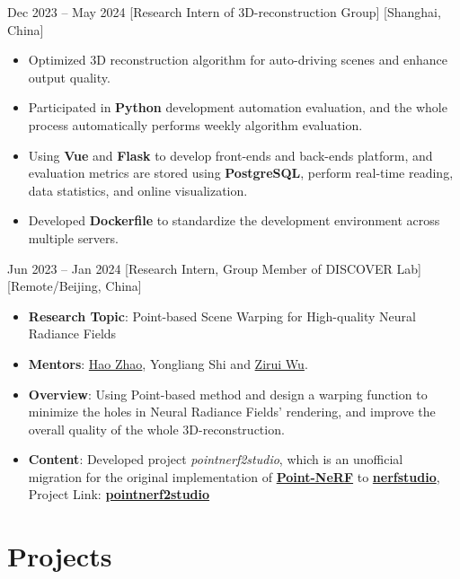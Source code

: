 \documentclass{chicv}
\begin{document}
{Dec 2023 -- May 2024}
  [Research Intern of 3D-reconstruction Group]
  [Shanghai, China]
  \begin{itemize}
    \item Optimized 3D reconstruction algorithm for auto-driving scenes and enhance output quality.
    \item Participated in \textbf{Python} development automation evaluation, and the whole process automatically performs weekly algorithm evaluation.
    \item Using \textbf{Vue} and \textbf{Flask} to develop front-ends and back-ends platform, and evaluation metrics are stored using \textbf{PostgreSQL}, perform real-time reading, data statistics, and online visualization.
    \item Developed \textbf{Dockerfile} to standardize the development environment across multiple servers.
  \end{itemize}

  {Jun 2023 -- Jan 2024}
  [Research Intern, Group Member of DISCOVER Lab]
  [Remote/Beijing, China]
  \begin{itemize}
    \item \textbf{Research Topic}: Point-based Scene Warping for High-quality Neural Radiance Fields
    \item \textbf{Mentors}: \href{https://sites.google.com/view/fromandto}{Hao Zhao}, Yongliang Shi and \href{https://wuzirui.github.io/}{Zirui Wu}.
    \item \textbf{Overview}: Using Point-based method and design a warping function to minimize the holes in Neural Radiance Fields' rendering, and improve the overall quality of the whole 3D-reconstruction.
    \item \textbf{Content}: Developed project \textit{pointnerf2studio}, which is an unofficial migration for the original implementation of \href{https://github.com/Xharlie/pointnerf/}{\textbf{Point-NeRF}} to \href{https://github.com/nerfstudio-project/nerfstudio/}{\textbf{nerfstudio}}, Project Link: \href{https://github.com/SHUzhekiNg/pointnerf2studio}{\textbf{pointnerf2studio}}
  \end{itemize}
\section{Projects}
\end{document}
